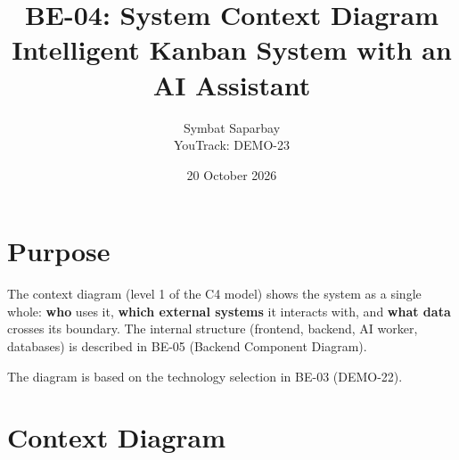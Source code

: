 \documentclass[11pt,a4paper]{article}
\title{\textbf{BE-04: System Context Diagram}\\[4pt]
\large Intelligent Kanban System with an AI Assistant}
\author{Symbat Saparbay\\ \small YouTrack: DEMO-23}
\date{20 October 2026}
\begin{document}
\maketitle

\section{Purpose}

The context diagram (level 1 of the C4 model) shows the system as a single whole: \textbf{who} uses it, \textbf{which external systems} it interacts with, and \textbf{what data} crosses its boundary. The internal structure (frontend, backend, AI worker, databases) is described in BE-05 (Backend Component Diagram).

The diagram is based on the technology selection in BE-03 (DEMO-22).

\section{Context Diagram}
\end{document}
